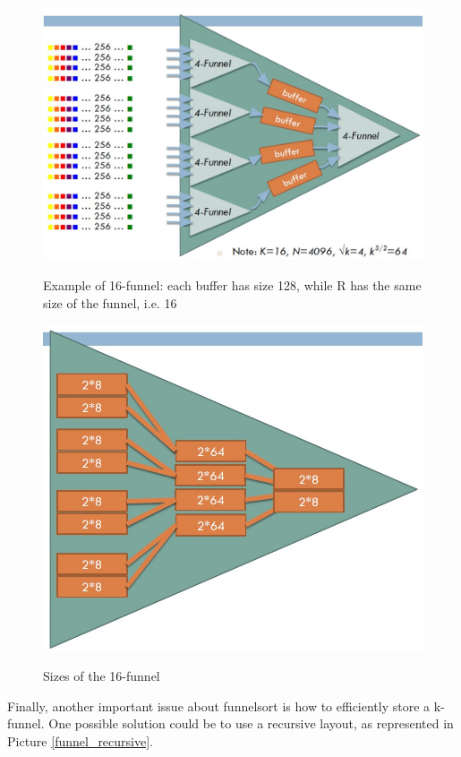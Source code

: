 \begin{figure}[h!]
		\centering
		\includegraphics[scale = 0.7]{img/example_funnelsort_1.jpg}
        \label{funnel1}
        \caption{Example of 16-funnel: each buffer has size 128, while R has the same size of the funnel, i.e. 16}
\end{figure}

\begin{figure}[h!]
		\centering
		\includegraphics[scale = 0.7]{img/example_funnelsort_2.jpg}
        \label{funnel2}
        \caption{Sizes of the 16-funnel}
\end{figure}

Finally, another important issue about funnelsort is how to efficiently store a k-funnel. One possible solution could be to use a recursive layout, as represented in Picture \ref{funnel_recursive}.

